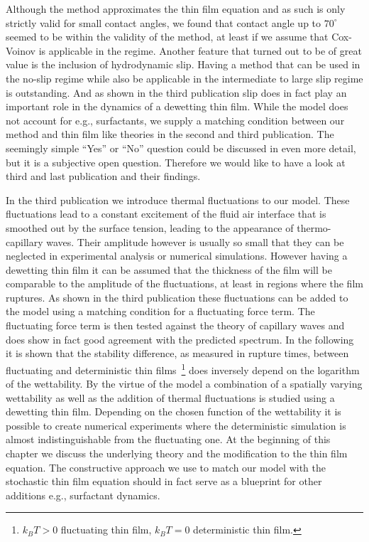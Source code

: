 Although the method approximates the thin film equation and as such is only strictly valid for small contact angles, we found that contact angle up to $70^{\circ}$ seemed to be within the validity of the method, at least if we assume that Cox-Voinov is applicable in the regime.
Another feature that turned out to be of great value is the inclusion of hydrodynamic slip.
Having a method that can be used in the no-slip regime while also be applicable in the intermediate to large slip regime is outstanding.
And as shown in the third publication slip does in fact play an important role in the dynamics of a dewetting thin film.
While the model does not account for e.g., surfactants, we supply a matching condition between our method and thin film like theories in the second and third publication.
The seemingly simple ``Yes'' or ``No'' question could be discussed in even more detail, but it is a subjective open question.
Therefore we would like to have a look at third and last publication and their findings.
 
In the third publication we introduce thermal fluctuations to our model.
These fluctuations lead to a constant excitement of the fluid air interface that is smoothed out by the surface tension, leading to the appearance of thermo-capillary waves.
Their amplitude however is usually so small that they can be neglected in experimental analysis or numerical simulations. 
However having a dewetting thin film it can be assumed that the thickness of the film will be comparable to the amplitude of the fluctuations, at least in regions where the film ruptures.
As shown in the third publication these fluctuations can be added to the model using a matching condition for a fluctuating force term. 
The fluctuating force term is then tested against the theory of capillary waves and does show in fact good agreement with the predicted spectrum.
In the following it is shown that the stability difference, as measured in rupture times, between fluctuating and deterministic thin films~\footnote{$k_BT > 0$ fluctuating thin film, $k_BT = 0$ deterministic thin film.} does inversely depend on the logarithm of the wettability. 
By the virtue of the model a combination of a spatially varying wettability as well as the addition of thermal fluctuations is studied using a dewetting thin film.
Depending on the chosen function of the wettability it is possible to create numerical experiments where the deterministic simulation is almost indistinguishable from the fluctuating one.
At the beginning of this chapter we discuss the underlying theory and the modification to the thin film equation.
The constructive approach we use to match our model with the stochastic thin film equation should in fact serve as a blueprint for other additions e.g., surfactant dynamics. 

